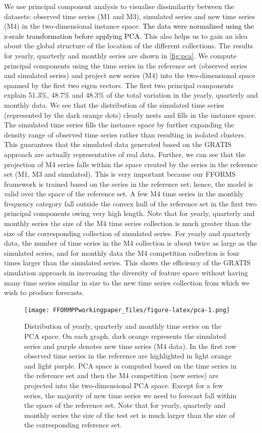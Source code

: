 \documentclass[11pt,a4paper,]{article}
\begin{document}
We use principal component analysis to visualise dissimilarity between the datasets: observed time series (M1 and M3), simulated series and new time series (M4) in the two-dimensional instance space. \textcolor{black}{The data were normalized using the z-scale transformation before applying PCA.} This also helps us to gain an idea about the global structure of the location of the different collections. The results for yearly, quarterly and monthly series are shown in \autoref{fig:pca}. We compute principal components using the time series in the reference set (observed series and simulated series) and project new series (M4) into the two-dimensional space spanned by the first two eigen vectors. The first two principal components explain 51.3\%, 48.7\% and 48.3\% of the total variation in the yearly, quarterly and monthly data. We see that the distribution of the simulated time series (represented by the dark orange dots) clearly nests and fills in the instance space. The simulated time series fills the instance space by further expanding the density range of observed time series rather than resulting in isolated clusters. This guarantees that the simulated data generated based on the GRATIS approach are actually representative of real data. Further, we can see that the projection of M4 series falls within the space created by the series in the reference set (M1, M3 and simulated). This is very important because our FFORMS framework is trained based on the series in the reference set; hence, the model is valid over the space of the reference set. A few M4 time series in the monthly frequency category fall outside the convex hull of the reference set in the first two principal components owing very high length. Note that for yearly, quarterly and monthly series the size of the M4 time series collection is much greater than the size of the corresponding collection of simulated series. For yearly and quarterly data, the number of time series in the M4 collection is about twice as large as the simulated series, and for monthly data the M4 competition collection is four times larger than the simulated series. This shows the efficiency of the GRATIS simulation approach in increasing the diversity of feature space without having many time series similar in size to the new time series collection from which we wish to produce forecasts.

\begin{figure}
\centering
\texttt{[image: FFORMPPworkingpaper\_files/figure-latex/pca-1.png]}
\caption{\label{fig:pca}Distribution of yearly, quarterly and monthly time series on the PCA space. On each graph, dark orange represents the simulated series and purple denotes new time series (M4 data). In the first row observed time series in the reference are highlighted in light orange and light purple. PCA space is computed based on the time series in the reference set and then the M4 competition (new series) are projected into the two-dimensional PCA space. Except for a few series, the majority of new time series we need to forecast fall within the space of the reference set. Note that for yearly, quarterly and monthly series the size of the test set is much larger than the size of the corresponding reference set.}
\end{figure}
\end{document}
